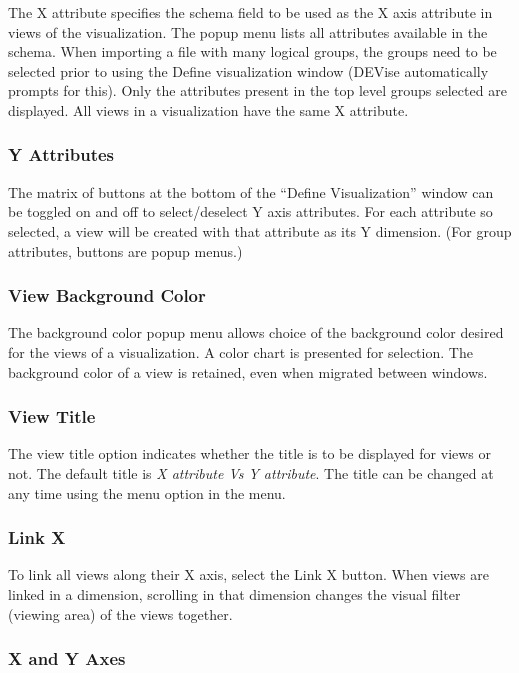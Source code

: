 The X attribute specifies the schema field to be used as the X axis attribute in
views of the visualization. The popup menu lists all attributes available in the
schema. When importing a file with many logical groups, the groups need to be
selected prior to using the Define visualization window (DEVise automatically
prompts for this). Only the attributes present in the top level groups selected
are displayed. All views in a visualization have the same X attribute.

\subsubsection{Y Attributes}

The matrix of buttons at the bottom of the ``Define Visualization'' window can
be toggled on and off to select/deselect Y axis attributes. For each attribute
so selected, a view will be created with that attribute as its Y dimension. (For
group attributes, buttons are popup menus.)

\subsubsection{View Background Color}

The background color popup menu allows choice of the background color desired
for the views of a visualization. A color chart is presented for selection. The
background color of a view is retained, even when migrated between windows.

\subsubsection{View Title}

The view title option indicates whether the title is to be displayed
for views or not. The default title is {\em X attribute Vs Y attribute}.
The title can be changed at any time using the  menu option in
the  menu.

\subsubsection{Link X}

To link all views along their X axis, select the Link X button. When views are
linked in a dimension, scrolling in that dimension changes the visual filter
(viewing area) of the views together.

\subsubsection{X and Y Axes}

